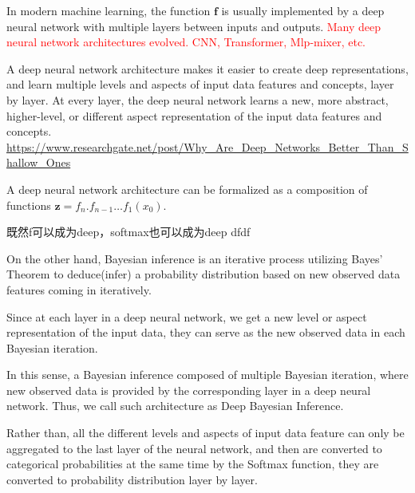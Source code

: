 \documentclass{article}
\begin{document}
In modern machine learning, the function $\bm{f}$ is usually implemented by a deep neural network with multiple layers between inputs and outputs.
\textcolor{red}{Many deep neural network architectures evolved. CNN, Transformer, Mlp-mixer, etc.}


A deep neural network architecture makes it easier to create deep representations, and learn multiple levels and aspects of input data features and concepts, layer by layer.
At every layer, the deep neural network learns a new, more abstract, higher-level, or different aspect representation of the input data features and concepts.
\url{https://www.researchgate.net/post/Why_Are_Deep_Networks_Better_Than_Shallow_Ones}

A deep neural network architecture can be formalized as a composition of functions $\bm{z} = f_{n} . f_{n-1} \ldots f_1(x_0) $.

既然f可以成为deep，softmax也可以成为deep dfdf

On the other hand, Bayesian inference is an iterative process utilizing Bayes' Theorem to deduce(infer) a probability distribution based on new observed data features coming in iteratively.

Since at each layer in a deep neural network, we get a new level or aspect representation of the input data,
they can serve as the new observed data in each Bayesian iteration.

In this sense, a Bayesian inference composed of multiple Bayesian iteration, where new observed data is provided by the corresponding layer in a deep neural network.
Thus, we call such architecture as Deep Bayesian Inference.

Rather than, all the different levels and aspects of input data feature can only be aggregated to the last layer of the neural network, and then are converted to categorical probabilities at the same time by the Softmax function,
they are converted to probability distribution layer by layer.
\end{document}
